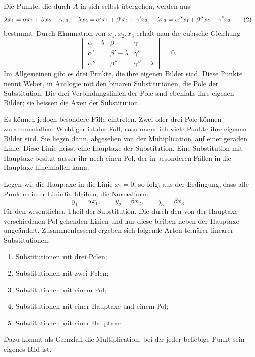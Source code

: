 \documentclass[11pt]{article}
\begin{document}
Die Punkte, die durch \(A\) in sich selbst übergehen, werden aus
\begin{equation}
\lambda x_1=\alpha x_1+\beta x_2+\gamma x_3,\notag
\quad
\lambda x_2=\alpha'x_1+\beta'x_2+\gamma'x_3,\notag
\quad
\lambda x_3=\alpha''x_1+\beta''x_2+\gamma''x_3
\tag{2}
\end{equation}
bestimmt. Durch Elimination von \(x_1,x_2,x_3\) erhält man die cubische Gleichung
\begin{equation}
\begin{vmatrix}
\alpha-\lambda&\beta&\gamma\\
\alpha'&\beta'-\lambda&\gamma'\\
\alpha''&\beta''&\gamma''-\lambda
\end{vmatrix}=0.
\tag{3}
\end{equation}
Im Allgemeinen gibt es drei Punkte, die ihre eigenen Bilder sind. Diese Punkte nennt Weber, in Analogie mit den binären Substitutionen, die Pole der Substitution. Die drei Verbindungslinien der Pole sind ebenfalls ihre eigenen Bilder; sie heissen die Axen der Substitution.

Es können jedoch besondere Fälle eintreten. Zwei oder drei Pole können zusammenfallen. Wichtiger ist der Fall, dass unendlich viele Punkte ihre eigenen Bilder sind. Sie liegen dann, abgesehen von der Multiplication, auf einer geraden Linie. Diese Linie heisst eine Hauptaxe der Substitution. Eine Substitution mit Hauptaxe besitzt ausser ihr noch einen Pol, der in besonderen Fällen in die Hauptaxe hineinfallen kann.

Legen wir die Hauptaxe in die Linie \(x_1=0\), so folgt aus der Bedingung, dass alle Punkte dieser Linie fix bleiben, die Normalform
\begin{equation}
y_1=\alpha x_1,
\qquad y_2=\beta x_2,
\qquad y_3=\beta x_3
\tag{4}
\end{equation}
für den wesentlichen Theil der Substitution. Die durch den von der Hauptaxe verschiedenen Pol gehenden Linien und nur diese bleiben neben der Hauptaxe ungeändert. Zusammenfassend ergeben sich folgende Arten ternärer linearer Substitutionen:
\begin{enumerate}[label=\arabic*.]
\item Substitutionen mit drei Polen;
\item Substitutionen mit zwei Polen;
\item Substitutionen mit einem Pol;
\item Substitutionen mit einer Hauptaxe und einem Pol;
\item Substitutionen mit einer Hauptaxe.
\end{enumerate}
Dazu kommt als Grenzfall die Multiplication, bei der jeder beliebige Punkt sein eigenes Bild ist.
\end{document}
